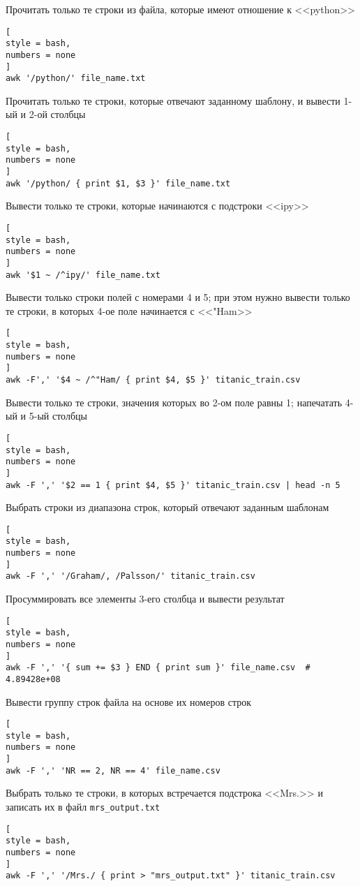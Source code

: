 \documentclass[%
	11pt,
	a4paper,
	utf8,
		]{article}
\begin{document}
Прочитать только те строки из файла, которые имеют отношение к <<python>>
\begin{lstlisting}[
style = bash,
numbers = none
]
awk '/python/' file_name.txt
\end{lstlisting}

Прочитать только те строки, которые отвечают заданному шаблону, и вывести 1-ый и 2-ой столбцы
\begin{lstlisting}[
style = bash,
numbers = none
]
awk '/python/ { print $1, $3 }' file_name.txt
\end{lstlisting}

Вывести только те строки, которые начинаются с подстроки <<ipy>>
\begin{lstlisting}[
style = bash,
numbers = none
]
awk '$1 ~ /^ipy/' file_name.txt
\end{lstlisting}

Вывести только строки полей с номерами 4 и 5; при этом нужно вывести только те строки, в которых 4-ое поле начинается с <<"Ham>>
\begin{lstlisting}[
style = bash,
numbers = none
]
awk -F',' '$4 ~ /^"Ham/ { print $4, $5 }' titanic_train.csv
\end{lstlisting}

Вывести только те строки, значения которых во 2-ом поле равны 1; напечатать 4-ый и 5-ый столбцы
\begin{lstlisting}[
style = bash,
numbers = none
]
awk -F ',' '$2 == 1 { print $4, $5 }' titanic_train.csv | head -n 5
\end{lstlisting}

Выбрать строки из диапазона строк, который отвечают заданным шаблонам
\begin{lstlisting}[
style = bash,
numbers = none
]
awk -F ',' '/Graham/, /Palsson/' titanic_train.csv
\end{lstlisting}

Просуммировать все элементы 3-его столбца и вывести результат
\begin{lstlisting}[
style = bash,
numbers = none
]
awk -F ',' '{ sum += $3 } END { print sum }' file_name.csv  # 4.89428e+08
\end{lstlisting}

Вывести группу строк файла на основе их номеров строк
\begin{lstlisting}[
style = bash,
numbers = none
]
awk -F ',' 'NR == 2, NR == 4' file_name.csv
\end{lstlisting}

Выбрать только те строки, в которых встречается подстрока <<Mrs.>> и записать их в файл \verb|mrs_output.txt|
\begin{lstlisting}[
style = bash,
numbers = none
]
awk -F ',' '/Mrs./ { print > "mrs_output.txt" }' titanic_train.csv
\end{lstlisting}
\end{document}
